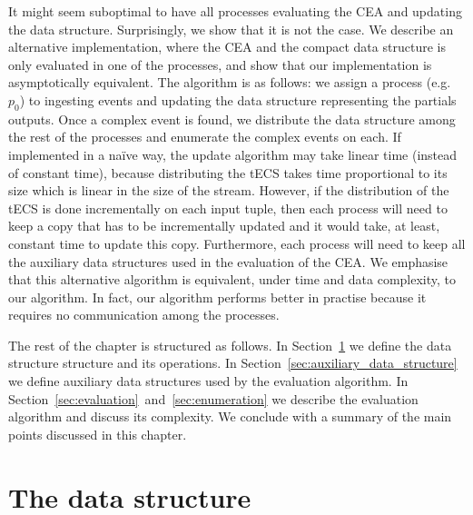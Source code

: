 It might seem suboptimal to have all processes evaluating the CEA and updating the data structure. Surprisingly, we show that it is not the case. We describe an alternative implementation, where the CEA and the compact data structure is only evaluated in one of the processes, and show that our implementation is asymptotically equivalent. The algorithm is as follows: we assign a process (e.g. $p_{0}$) to ingesting events and updating the data structure representing the partials outputs. Once a complex event is found, we distribute the data structure among the rest of the processes and enumerate the complex events on each. If implemented in a na\"ive way, the update algorithm may take linear time (instead of constant time), because distributing the tECS takes time proportional to its size which is linear in the size of the stream. However, if the distribution of the tECS is done incrementally on each input tuple, then each process will need to keep a copy that has to be incrementally updated and it would take, at least, constant time to update this copy. Furthermore, each process will need to keep all the auxiliary data structures used in the evaluation of the CEA. We emphasise that this alternative algorithm is equivalent, under time and data complexity, to our  algorithm. In fact, our algorithm performs better in practise because it requires no communication among the processes.

The rest of the chapter is structured as follows. In Section~\ref{sec:data_structure} we define the data structure structure and its operations. In Section~\ref{sec:auxiliary_data_structure} we define auxiliary data structures used by the evaluation algorithm. In Section~\ref{sec:evaluation}~and~\ref{sec:enumeration} we describe the evaluation algorithm and discuss its complexity. We conclude with a summary of the main points discussed in this chapter.

\section{The data structure}\label{sec:data_structure}

